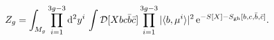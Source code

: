 \begin{equation}
Z_g = \int_{M_g}\prod_{i=1}^{3g-3} {\rm d}^2 y^i \,\int {\cal
D}[Xbc\bar b\bar c] \prod_{i=1}^{3g-3} |\langle b, \mu^i\rangle
|^2 \,
 {\rm e}^{-S[X]- S_{\rm gh}[b,c,\bar b, \bar c]} .
\end{equation}

